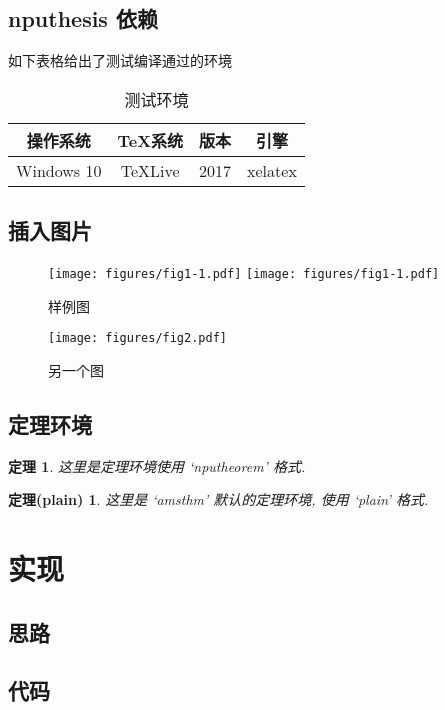 \documentclass[twoside, workbib, UTF8, phd]{nputhesis}
\newtheorem{thm}{定理}[section]
\theoremstyle{plain}
\newtheorem{plain-thm}{定理(plain)}[section]
\begin{document}
\section{nputhesis 依赖}
如下表格给出了测试编译通过的环境
\begin{table}[h]
  \caption{测试环境\cite{Liu2013}}
  \centering
  \begin{tabular}{cccc}
    \toprule
    操作系统    & \TeX 系统   & 版本  & 引擎\\
    \midrule
    Windows 10  & TeXLive     & 2017  & xelatex\\
    \bottomrule
  \end{tabular}
\end{table}

\section{插入图片}
\lipsum[1-3]
\begin{figure}
    \centering
    \texttt{[image: figures/fig1-1.pdf]}
    \texttt{[image: figures/fig1-1.pdf]}
    \caption{样例图}
\end{figure}
\begin{figure}
    \centering
    \texttt{[image: figures/fig2.pdf]}
    \caption{另一个图}
\end{figure}
\lipsum[4-6]
\section{定理环境}
\lipsum[1]
\begin{thm}
    这里是定理环境使用 `nputheorem' 格式.
\end{thm}
\lipsum[2]
\begin{plain-thm}
    这里是 `amsthm' 默认的定理环境, 使用 `plain' 格式.
\end{plain-thm}
\lipsum[3]

\chapter{实现}
\section{思路}
\section{代码}
\end{document}
